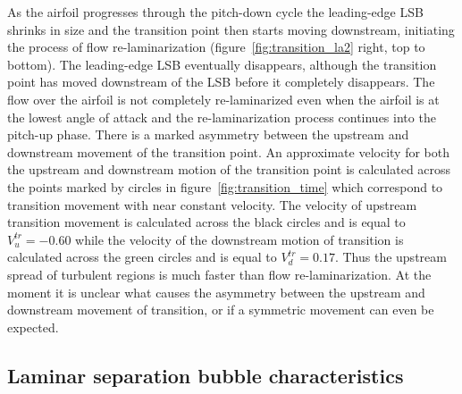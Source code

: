 As the airfoil progresses through the pitch-down cycle the leading-edge LSB shrinks in size and the transition point then starts moving downstream, initiating the process of flow re-laminarization (figure~\ref{fig:transition_la2} right, top to bottom). The leading-edge LSB eventually disappears, although the transition point has moved downstream of the LSB before it completely disappears. The flow over the airfoil is not completely re-laminarized even when the airfoil is at the lowest angle of attack and the re-laminarization process continues into the pitch-up phase. There is a marked asymmetry between the upstream and downstream movement of the transition point. An approximate velocity for both the upstream and downstream motion of the transition point is calculated across the points marked by circles in figure~\ref{fig:transition_time} which correspond to transition movement with near constant velocity. The velocity of upstream transition movement is calculated across the black circles and is equal to $V^{tr}_{u}=-0.60$ while the velocity of the downstream motion of transition is calculated across the green circles and is equal to $V^{tr}_{d}=0.17$. Thus the upstream spread of turbulent regions is much faster than flow re-laminarization. At the moment it is unclear what causes the asymmetry between the upstream and downstream movement of transition, or if a symmetric movement can even be expected.

\subsection{Laminar separation bubble characteristics}

